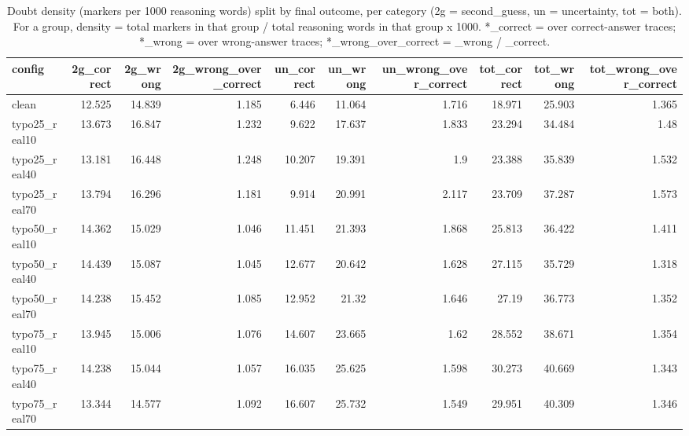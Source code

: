 \documentclass[11pt]{article}
\begin{document}
\begin{table}[H]
\centering
\caption{Doubt density (markers per 1000 reasoning words) split by final outcome, per category (2g = second\_guess, un = uncertainty, tot = both). For a group, density = total markers in that group / total reasoning words in that group x 1000. *\_correct = over correct-answer traces; *\_wrong = over wrong-answer traces; *\_wrong\_over\_correct = \_wrong / \_correct.}
\small
\begin{adjustbox}{max width=\textwidth}
\begin{tabular}{lrrrrrrrrr}
\toprule
\textbf{config} & \textbf{2g\_correct} & \textbf{2g\_wrong} & \textbf{2g\_wrong\_over\_correct} & \textbf{un\_correct} & \textbf{un\_wrong} & \textbf{un\_wrong\_over\_correct} & \textbf{tot\_correct} & \textbf{tot\_wrong} & \textbf{tot\_wrong\_over\_correct} \\
\midrule
clean & 12.525 & 14.839 & 1.185 & 6.446 & 11.064 & 1.716 & 18.971 & 25.903 & 1.365 \\
typo25\_real10 & 13.673 & 16.847 & 1.232 & 9.622 & 17.637 & 1.833 & 23.294 & 34.484 & 1.48 \\
typo25\_real40 & 13.181 & 16.448 & 1.248 & 10.207 & 19.391 & 1.9 & 23.388 & 35.839 & 1.532 \\
typo25\_real70 & 13.794 & 16.296 & 1.181 & 9.914 & 20.991 & 2.117 & 23.709 & 37.287 & 1.573 \\
typo50\_real10 & 14.362 & 15.029 & 1.046 & 11.451 & 21.393 & 1.868 & 25.813 & 36.422 & 1.411 \\
typo50\_real40 & 14.439 & 15.087 & 1.045 & 12.677 & 20.642 & 1.628 & 27.115 & 35.729 & 1.318 \\
typo50\_real70 & 14.238 & 15.452 & 1.085 & 12.952 & 21.32 & 1.646 & 27.19 & 36.773 & 1.352 \\
typo75\_real10 & 13.945 & 15.006 & 1.076 & 14.607 & 23.665 & 1.62 & 28.552 & 38.671 & 1.354 \\
typo75\_real40 & 14.238 & 15.044 & 1.057 & 16.035 & 25.625 & 1.598 & 30.273 & 40.669 & 1.343 \\
typo75\_real70 & 13.344 & 14.577 & 1.092 & 16.607 & 25.732 & 1.549 & 29.951 & 40.309 & 1.346 \\
\bottomrule
\end{tabular}
\end{adjustbox}
\end{table}
\end{document}
